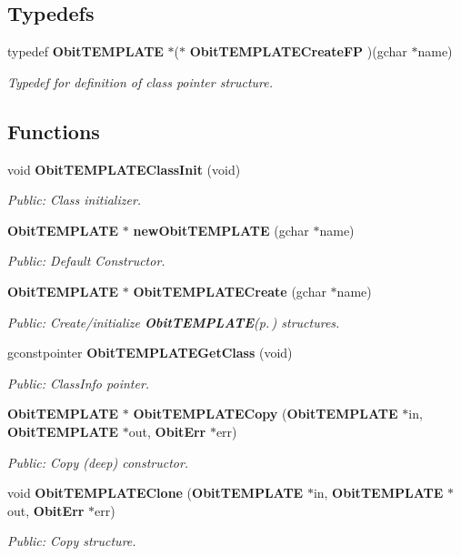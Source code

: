 \subsection*{Typedefs}
\begin{CompactItemize}
\item 
typedef {\bf Obit\-TEMPLATE} $\ast$($\ast$ {\bf Obit\-TEMPLATECreate\-FP} )(gchar $\ast$name)
\begin{CompactList}\small\item\em Typedef for definition of class pointer structure. \item\end{CompactList}\end{CompactItemize}
\subsection*{Functions}
\begin{CompactItemize}
\item 
void {\bf Obit\-TEMPLATEClass\-Init} (void)
\begin{CompactList}\small\item\em Public: Class initializer. \item\end{CompactList}\item 
{\bf Obit\-TEMPLATE} $\ast$ {\bf new\-Obit\-TEMPLATE} (gchar $\ast$name)
\begin{CompactList}\small\item\em Public: Default Constructor. \item\end{CompactList}\item 
{\bf Obit\-TEMPLATE} $\ast$ {\bf Obit\-TEMPLATECreate} (gchar $\ast$name)
\begin{CompactList}\small\item\em Public: Create/initialize {\bf Obit\-TEMPLATE}{\rm (p.\,\pageref{structObitTEMPLATE})} structures. \item\end{CompactList}\item 
gconstpointer {\bf Obit\-TEMPLATEGet\-Class} (void)
\begin{CompactList}\small\item\em Public: Class\-Info pointer. \item\end{CompactList}\item 
{\bf Obit\-TEMPLATE} $\ast$ {\bf Obit\-TEMPLATECopy} ({\bf Obit\-TEMPLATE} $\ast$in, {\bf Obit\-TEMPLATE} $\ast$out, {\bf Obit\-Err} $\ast$err)
\begin{CompactList}\small\item\em Public: Copy (deep) constructor. \item\end{CompactList}\item 
void {\bf Obit\-TEMPLATEClone} ({\bf Obit\-TEMPLATE} $\ast$in, {\bf Obit\-TEMPLATE} $\ast$out, {\bf Obit\-Err} $\ast$err)
\begin{CompactList}\small\item\em Public: Copy structure. \item\end{CompactList}\end{CompactItemize}



